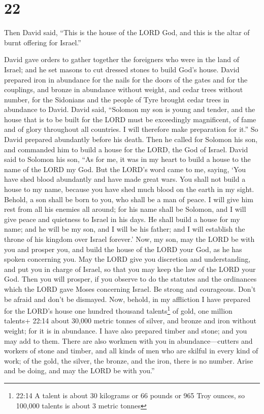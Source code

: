 \hypertarget{section-21}{%
\section{22}\label{section-21}}

 Then David said, ``This is the house of the LORD God, and
this is the altar of burnt offering for Israel.''

 David gave orders to gather together the foreigners who
were in the land of Israel; and he set masons to cut dressed stones to
build God's house.  David prepared iron in abundance for the
nails for the doors of the gates and for the couplings, and bronze in
abundance without weight,  and cedar trees without number,
for the Sidonians and the people of Tyre brought cedar trees in
abundance to David.  David said, ``Solomon my son is young
and tender, and the house that is to be built for the LORD must be
exceedingly magnificent, of fame and of glory throughout all countries.
I will therefore make preparation for it.'' So David prepared abundantly
before his death.  Then he called for Solomon his son, and
commanded him to build a house for the LORD, the God of Israel.
 David said to Solomon his son, ``As for me, it was in my
heart to build a house to the name of the LORD my God.  But
the LORD's word came to me, saying, `You have shed blood abundantly and
have made great wars. You shall not build a house to my name, because
you have shed much blood on the earth in my sight.  Behold,
a son shall be born to you, who shall be a man of peace. I will give him
rest from all his enemies all around; for his name shall be Solomon, and
I will give peace and quietness to Israel in his days.  He
shall build a house for my name; and he will be my son, and I will be
his father; and I will establish the throne of his kingdom over Israel
forever.'  Now, my son, may the LORD be with you and
prosper you, and build the house of the LORD your God, as he has spoken
concerning you.  May the LORD give you discretion and
understanding, and put you in charge of Israel, so that you may keep the
law of the LORD your God.  Then you will prosper, if you
observe to do the statutes and the ordinances which the LORD gave Moses
concerning Israel. Be strong and courageous. Don't be afraid and don't
be dismayed.  Now, behold, in my affliction I have prepared
for the LORD's house one hundred thousand talents\footnote{22:14 A
  talent is about 30 kilograms or 66 pounds or 965 Troy ounces, so
  100,000 talents is about 3 metric tonnes} of gold, one million
talents+ 22:14 about 30,000 metric tonnes of silver, and bronze and iron
without weight; for it is in abundance. I have also prepared timber and
stone; and you may add to them.  There are also workmen
with you in abundance---cutters and workers of stone and timber, and all
kinds of men who are skilful in every kind of work;  of the
gold, the silver, the bronze, and the iron, there is no number. Arise
and be doing, and may the LORD be with you.''

